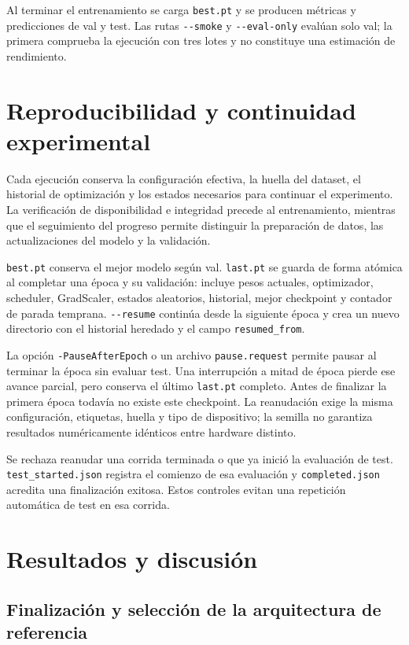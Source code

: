 \documentclass[11pt,a4paper]{article}
\newcommand{\archivo}[1]{\nolinkurl{#1}}
\begin{document}
Al terminar el entrenamiento se carga \archivo{best.pt} y se producen métricas
y predicciones de val y test. Las rutas \archivo{--smoke} y
\archivo{--eval-only} evalúan solo val; la primera comprueba la ejecución con
tres lotes y no constituye una estimación de rendimiento.

\section{Reproducibilidad y continuidad experimental}

Cada ejecución conserva la configuración efectiva, la huella del dataset,
el historial de optimización y los estados necesarios para continuar el
experimento. La verificación de disponibilidad e integridad precede al
entrenamiento, mientras que el seguimiento del progreso permite distinguir
la preparación de datos, las actualizaciones del modelo y la validación.

\archivo{best.pt} conserva el mejor modelo según val.
\archivo{last.pt} se guarda de forma atómica al completar una época y su validación:
incluye pesos actuales, optimizador, scheduler, GradScaler, estados aleatorios,
historial, mejor checkpoint y contador de parada temprana.
\archivo{--resume} continúa desde la siguiente época y crea un nuevo directorio
con el historial heredado y el campo \archivo{resumed_from}.

La opción \archivo{-PauseAfterEpoch} o un archivo \archivo{pause.request} permite
pausar al terminar la época sin evaluar test. Una interrupción a mitad de época
pierde ese avance parcial, pero conserva el último \archivo{last.pt} completo.
Antes de finalizar la primera época todavía no existe este checkpoint.
La reanudación exige la misma configuración, etiquetas, huella y tipo de dispositivo;
la semilla no garantiza resultados numéricamente idénticos entre hardware distinto.

Se rechaza reanudar una corrida terminada o que ya inició la evaluación de test.
\archivo{test_started.json} registra el comienzo de esa evaluación y
\archivo{completed.json} acredita una finalización exitosa.
Estos controles evitan una repetición automática de test en esa corrida.

\section{Resultados y discusión}

\subsection{Finalización y selección de la arquitectura de referencia}
\end{document}
